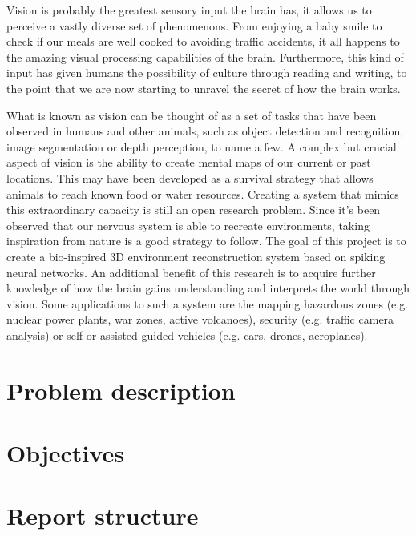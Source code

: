 Vision is probably the greatest sensory input the brain has, it allows us to perceive a vastly diverse set of phenomenons. From enjoying a baby smile to check if our meals are well cooked to avoiding traffic accidents, it all happens to the amazing visual processing capabilities of the brain. Furthermore, this kind of input has given humans the possibility of culture through reading and writing, to the point that we are now starting to unravel the secret of how the brain works.

What is known as vision can be thought of as a set of tasks that have been observed in humans and other animals, such as object detection and recognition, image segmentation or depth perception, to name a few. A complex but crucial aspect of vision is the ability to create mental maps of our current or past locations. This may have been developed as a survival strategy that allows animals to reach known food or water resources. Creating a system that mimics this extraordinary capacity is still an open research problem. Since it's been observed that our nervous system is able to recreate environments, taking inspiration from nature is a good strategy to follow. The goal of this project is to create a bio-inspired 3D environment reconstruction system based on spiking neural networks. An additional benefit of this research is to acquire further knowledge of how the brain gains understanding and interprets the world through vision. Some applications to such a system are the mapping hazardous zones (e.g. nuclear power plants, war zones, active volcanoes), security (e.g. traffic camera analysis) or self or assisted guided vehicles (e.g. cars, drones, aeroplanes).

\section{Problem description}
\label{sec:intro:problem}


\section{Objectives}
\label{sec:intro:objectives}

%

\section{Report structure}
\label{sec:intro:structure}
